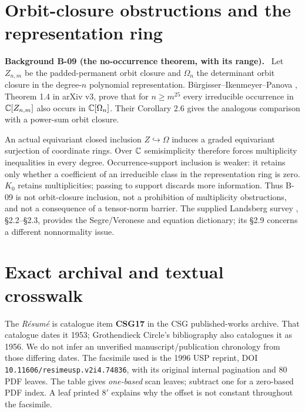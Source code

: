 \documentclass[11pt]{article}
\newenvironment{background}[2]{\par\medskip\noindent\textbf{Background #1 (#2).}\ }{\par\medskip}
\begin{document}
\section{Orbit-closure obstructions and the representation ring}
\begin{background}{B-09}{the no-occurrence theorem, with its range}
Let $Z_{n,m}$ be the padded-permanent orbit closure and
$\Omega_n$ the determinant orbit closure in the degree-$n$
polynomial representation. B\"urgisser--Ikenmeyer--Panova
\cite{BIP}, Theorem 1.4 in arXiv v3, prove that for
$n\geq m^{25}$ every irreducible occurrence in
$\mathbb C[Z_{n,m}]$ also occurs in $\mathbb C[\Omega_n]$.
Their Corollary 2.6 gives the analogous comparison with a
power-sum orbit closure.
\end{background}
An actual equivariant closed inclusion $Z\hookrightarrow\Omega$
induces a graded equivariant surjection of coordinate rings.
Over $\mathbb C$ semisimplicity therefore forces multiplicity inequalities
in every degree. Occurrence-support inclusion is weaker:
it retains only whether a coefficient of an irreducible class in
the representation ring is zero. $K_0$ retains multiplicities;
passing to support discards more information.
Thus B-09 is not orbit-closure inclusion, not a prohibition of
multiplicity obstructions, and not a consequence of a tensor-norm
barrier. The supplied Landsberg survey \cite{Land}, \S2.2--\S2.3,
provides the Segre/Veronese and equation dictionary; its \S2.9
concerns a different nonnormality issue.

\section{Exact archival and textual crosswalk}\label{sec:archive}
The \emph{R\'esum\'e} is catalogue item \textbf{CSG17} in the
CSG published-works archive. That catalogue dates it 1953;
Grothendieck Circle's bibliography also catalogues it as 1956.
We do not infer an unverified manuscript/publication chronology
from those differing dates. The facsimile used is the 1996 USP
reprint, DOI \texttt{10.11606/resimeusp.v2i4.74836}, with its
original internal pagination and 80 PDF leaves.
The table gives \emph{one-based} scan leaves; subtract one for
a zero-based PDF index. A leaf printed $8'$ explains why the
offset is not constant throughout the facsimile.
\end{document}
